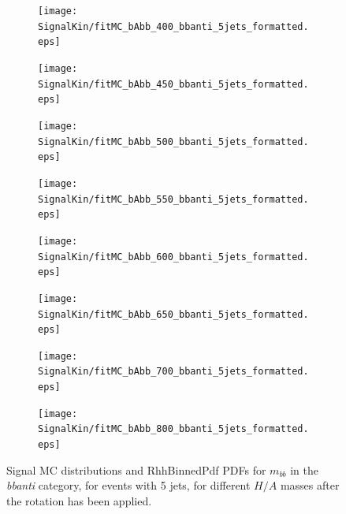 \begin{figure}[phtb!]
  \begin{center}
  \begin{subfigure}[$m_{A}=400$ GeV]{0.4\textwidth}\texttt{[image: SignalKin/fitMC\_bAbb\_400\_bbanti\_5jets\_formatted.eps]}\end{subfigure}
  \begin{subfigure}[$m_{A}=450$ GeV]{0.4\textwidth}\texttt{[image: SignalKin/fitMC\_bAbb\_450\_bbanti\_5jets\_formatted.eps]}\end{subfigure}
  \begin{subfigure}[$m_{A}=500$ GeV]{0.4\textwidth}\texttt{[image: SignalKin/fitMC\_bAbb\_500\_bbanti\_5jets\_formatted.eps]}\end{subfigure}
  \begin{subfigure}[$m_{A}=550$ GeV]{0.4\textwidth}\texttt{[image: SignalKin/fitMC\_bAbb\_550\_bbanti\_5jets\_formatted.eps]}\end{subfigure}
  \begin{subfigure}[$m_{A}=600$ GeV]{0.4\textwidth}\texttt{[image: SignalKin/fitMC\_bAbb\_600\_bbanti\_5jets\_formatted.eps]}\end{subfigure}
  \begin{subfigure}[$m_{A}=650$ GeV]{0.4\textwidth}\texttt{[image: SignalKin/fitMC\_bAbb\_650\_bbanti\_5jets\_formatted.eps]}\end{subfigure}
  \begin{subfigure}[$m_{A}=700$ GeV]{0.4\textwidth}\texttt{[image: SignalKin/fitMC\_bAbb\_700\_bbanti\_5jets\_formatted.eps]}\end{subfigure}
  \begin{subfigure}[$m_{A}=800$ GeV]{0.4\textwidth}\texttt{[image: SignalKin/fitMC\_bAbb\_800\_bbanti\_5jets\_formatted.eps]}\end{subfigure}
  \caption{Signal MC distributions and RhhBinnedPdf PDFs for $m_{bb}$ in the {\it bbanti} category, for events with 5 jets, for different $H/A$ masses after the rotation has been applied.\label{fig:signalPDFs_5j_bbanti}} 
    \end{center}
\end{figure}


